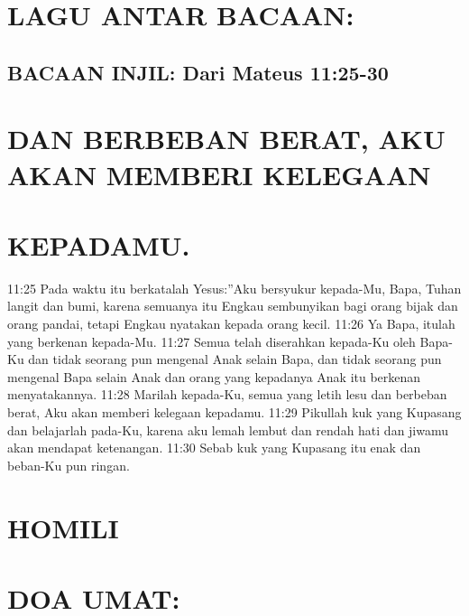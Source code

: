 \section*{LAGU ANTAR BACAAN:}

\subsection*{BACAAN INJIL: Dari Mateus 11:25-30}

\section*{DAN BERBEBAN BERAT, AKU AKAN MEMBERI KELEGAAN}

\section*{KEPADAMU.}

11:25 Pada waktu itu berkatalah Yesus:”Aku bersyukur kepada-Mu,
Bapa, Tuhan langit dan bumi, karena semuanya itu Engkau
sembunyikan bagi orang bijak dan orang pandai, tetapi Engkau
nyatakan kepada orang kecil. 11:26 Ya Bapa, itulah yang berkenan
kepada-Mu. 11:27 Semua telah diserahkan kepada-Ku oleh Bapa-Ku
dan tidak seorang pun mengenal Anak selain Bapa, dan tidak seorang
pun mengenal Bapa selain Anak dan orang yang kepadanya Anak itu
berkenan menyatakannya. 11:28 Marilah kepada-Ku, semua yang
letih lesu dan berbeban berat, Aku akan memberi kelegaan
kepadamu. 11:29 Pikullah kuk yang Kupasang dan belajarlah pada-Ku, karena aku lemah lembut dan rendah hati dan jiwamu akan
mendapat ketenangan. 11:30 Sebab kuk yang Kupasang itu enak dan
beban-Ku pun ringan.

\section*{HOMILI}

\section*{DOA UMAT:}


